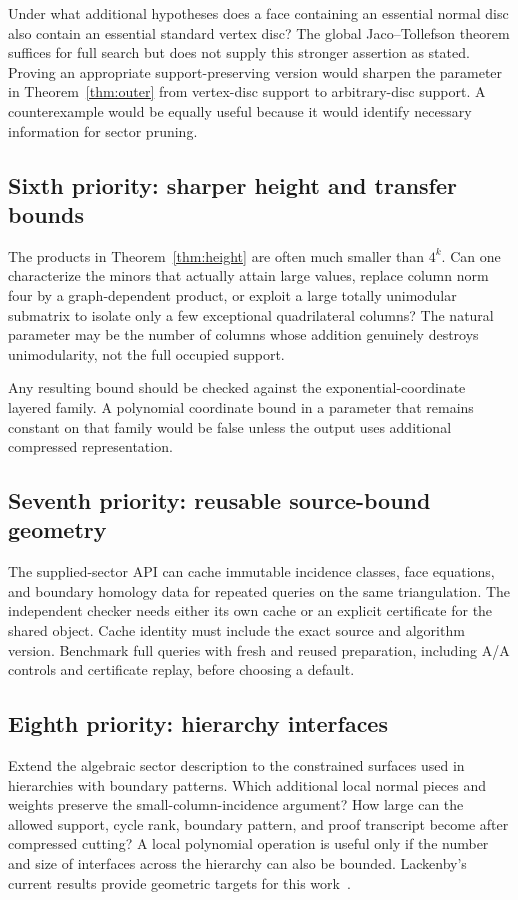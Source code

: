 \documentclass[11pt]{article}
\theoremstyle{definition}
\theoremstyle{remark}
\begin{document}
Under what additional hypotheses does a face containing an essential normal
disc also contain an essential standard vertex disc? The global
Jaco--Tollefson theorem suffices for full search but does not supply this
stronger assertion as stated. Proving an appropriate support-preserving
version would sharpen the parameter in Theorem~\ref{thm:outer} from vertex-disc
support to arbitrary-disc support. A counterexample would be equally useful
because it would identify necessary information for sector pruning.

\subsection{Sixth priority: sharper height and transfer bounds}

The products in Theorem~\ref{thm:height} are often much smaller than $4^k$.
Can one characterize the minors that actually attain large values, replace
column norm four by a graph-dependent product, or exploit a large totally
unimodular submatrix to isolate only a few exceptional quadrilateral columns?
The natural parameter may be the number of columns whose addition genuinely
destroys unimodularity, not the full occupied support.

Any resulting bound should be checked against the exponential-coordinate
layered family. A polynomial coordinate bound in a parameter that remains
constant on that family would be false unless the output uses additional
compressed representation.

\subsection{Seventh priority: reusable source-bound geometry}

The supplied-sector API can cache immutable incidence classes, face equations,
and boundary homology data for repeated queries on the same triangulation.
The independent checker needs either its own cache or an explicit certificate
for the shared object. Cache identity must include the exact source and
algorithm version. Benchmark full queries with fresh and reused preparation,
including A/A controls and certificate replay, before choosing a default.

\subsection{Eighth priority: hierarchy interfaces}

Extend the algebraic sector description to the constrained surfaces used in
hierarchies with boundary patterns. Which additional local normal pieces and
weights preserve the small-column-incidence argument? How large can the
allowed support, cycle rank, boundary pattern, and proof transcript become
after compressed cutting? A local polynomial operation is useful only if
the number and size of interfaces across the hierarchy can also be bounded.
Lackenby's current results provide geometric targets for this work~\cite{lackenby2026}.
\end{document}
